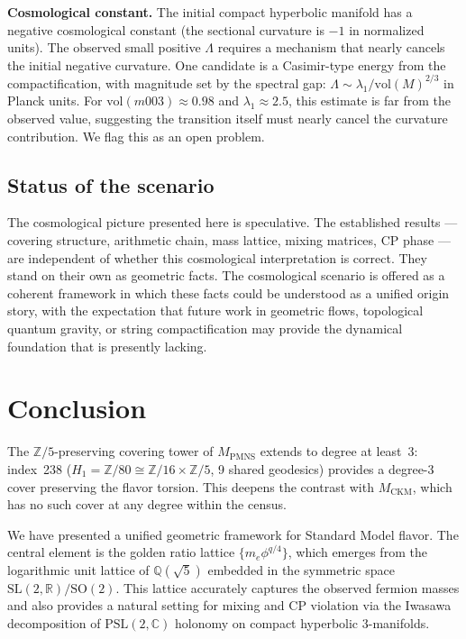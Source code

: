 \documentclass[12pt]{article}
\theoremstyle{definition}
\begin{document}
\textbf{Cosmological constant.} The initial compact hyperbolic
manifold has a negative cosmological constant (the sectional curvature
is $-1$ in normalized units). The observed small positive $\Lambda$
requires a mechanism that nearly cancels the initial negative
curvature. One candidate is a Casimir-type energy from the
compactification, with magnitude set by the spectral gap:
$\Lambda \sim \lambda_1 / \mathrm{vol}(M)^{2/3}$ in Planck units.
For $\mathrm{vol}(m003) \approx 0.98$ and $\lambda_1 \approx 2.5$,
this estimate is far from the observed value, suggesting the
transition itself must nearly cancel the curvature contribution.
We flag this as an open problem.

\subsection{Status of the scenario}

The cosmological picture presented here is speculative. The
established results --- covering structure, arithmetic chain, mass
lattice, mixing matrices, CP phase --- are independent of whether
this cosmological interpretation is correct. They stand on their own
as geometric facts. The cosmological scenario is offered as a
coherent framework in which these facts could be understood as a
unified origin story, with the expectation that future work in
geometric flows, topological quantum gravity, or string
compactification may provide the dynamical foundation that is
presently lacking.

\section{Conclusion}
\label{sec:conclusion}

The $\mathbb{Z}/5$-preserving covering tower of $M_\text{PMNS}$ extends to degree at least~3: index~238 ($H_1=\mathbb{Z}/80\cong\mathbb{Z}/16\times\mathbb{Z}/5$, 9 shared geodesics) provides a degree-3 cover preserving the flavor torsion. This deepens the contrast with $M_\text{CKM}$, which has no such cover at any degree within the census.

We have presented a unified geometric framework for Standard Model flavor. The central element is the golden ratio lattice $\{m_e \phi^{q/4}\}$, which emerges from the logarithmic unit lattice of $\mathbb{Q}(\sqrt5)$ embedded in the symmetric space $\mathrm{SL}(2,\mathbb{R})/\mathrm{SO}(2)$. This lattice accurately captures the observed fermion masses and also provides a natural setting for mixing and CP violation via the Iwasawa decomposition of $\mathrm{PSL}(2,\mathbb{C})$ holonomy on compact hyperbolic 3-manifolds.
\end{document}
